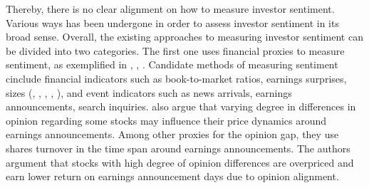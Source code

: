 \documentclass[11pt]{article}
\begin{document}

Thereby, there is no clear alignment on how to measure investor sentiment. Various ways has been undergone in order to assess investor sentiment in its broad sense. Overall, the existing approaches to measuring investor sentiment can be divided into two categories. The first one uses financial proxies to measure sentiment, as exemplified  in \cite{de1990noise}, \cite{barberis1998model}, \cite{baker2007investor}. Candidate methods of measuring sentiment cinclude financial indicators such as book-to-market ratios, earnings surprises, sizes (\cite{FRIEND1988}, \cite{FAMA1992},  \cite{KOTHARI1997}, \cite{PONTIFF1998}, \cite{Maheu2004}), and event indicators such as news arrivals, earnings announcements, search inquiries. \cite{BERKMAN2009} also argue that varying degree in differences in opinion regarding some stocks may influence their price dynamics around earnings announcements. Among other proxies for the opinion gap, they use shares turnover in the time span around earnings announcements. The authors argument that stocks with high degree of opinion differences are overpriced and earn lower return on earnings announcement days due to opinion alignment.
\end{document}
